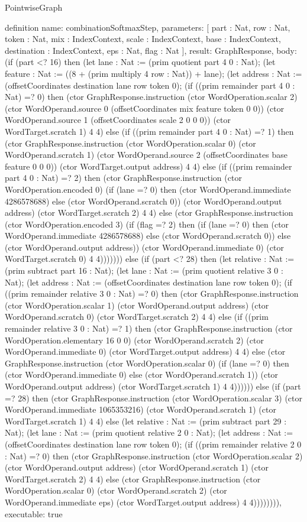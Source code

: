 \begin{lexlean}{PointwiseGraph}
\begin{semanticmodule}
definition{
  name: combinationSoftmaxStep,
  parameters: [
    part : Nat,
    row : Nat,
    token : Nat,
    mix : IndexContext,
    scale : IndexContext,
    base : IndexContext,
    destination : IndexContext,
    eps : Nat,
    flag : Nat
  ],
  result: GraphResponse,
  body: (if (part <? 16) then (let lane : Nat := (prim quotient part 4 0 : Nat); (let feature : Nat := ((8 + (prim multiply 4 row : Nat)) + lane); (let address : Nat := (offsetCoordinates destination lane row token 0); (if ((prim remainder part 4 0 : Nat) =? 0) then (ctor GraphResponse.instruction (ctor WordOperation.scalar 2) (ctor WordOperand.source 0 (offsetCoordinates mix feature token 0 0)) (ctor WordOperand.source 1 (offsetCoordinates scale 2 0 0 0)) (ctor WordTarget.scratch 1) 4 4) else (if ((prim remainder part 4 0 : Nat) =? 1) then (ctor GraphResponse.instruction (ctor WordOperation.scalar 0) (ctor WordOperand.scratch 1) (ctor WordOperand.source 2 (offsetCoordinates base feature 0 0 0)) (ctor WordTarget.output address) 4 4) else (if ((prim remainder part 4 0 : Nat) =? 2) then (ctor GraphResponse.instruction (ctor WordOperation.encoded 0) (if (lane =? 0) then (ctor WordOperand.immediate 4286578688) else (ctor WordOperand.scratch 0)) (ctor WordOperand.output address) (ctor WordTarget.scratch 2) 4 4) else (ctor GraphResponse.instruction (ctor WordOperation.encoded 3) (if (flag =? 2) then (if (lane =? 0) then (ctor WordOperand.immediate 4286578688) else (ctor WordOperand.scratch 0)) else (ctor WordOperand.output address)) (ctor WordOperand.immediate 0) (ctor WordTarget.scratch 0) 4 4))))))) else (if (part <? 28) then (let relative : Nat := (prim subtract part 16 : Nat); (let lane : Nat := (prim quotient relative 3 0 : Nat); (let address : Nat := (offsetCoordinates destination lane row token 0); (if ((prim remainder relative 3 0 : Nat) =? 0) then (ctor GraphResponse.instruction (ctor WordOperation.scalar 1) (ctor WordOperand.output address) (ctor WordOperand.scratch 0) (ctor WordTarget.scratch 2) 4 4) else (if ((prim remainder relative 3 0 : Nat) =? 1) then (ctor GraphResponse.instruction (ctor WordOperation.elementary 16 0 0) (ctor WordOperand.scratch 2) (ctor WordOperand.immediate 0) (ctor WordTarget.output address) 4 4) else (ctor GraphResponse.instruction (ctor WordOperation.scalar 0) (if (lane =? 0) then (ctor WordOperand.immediate 0) else (ctor WordOperand.scratch 1)) (ctor WordOperand.output address) (ctor WordTarget.scratch 1) 4 4)))))) else (if (part =? 28) then (ctor GraphResponse.instruction (ctor WordOperation.scalar 3) (ctor WordOperand.immediate 1065353216) (ctor WordOperand.scratch 1) (ctor WordTarget.scratch 1) 4 4) else (let relative : Nat := (prim subtract part 29 : Nat); (let lane : Nat := (prim quotient relative 2 0 : Nat); (let address : Nat := (offsetCoordinates destination lane row token 0); (if ((prim remainder relative 2 0 : Nat) =? 0) then (ctor GraphResponse.instruction (ctor WordOperation.scalar 2) (ctor WordOperand.output address) (ctor WordOperand.scratch 1) (ctor WordTarget.scratch 2) 4 4) else (ctor GraphResponse.instruction (ctor WordOperation.scalar 0) (ctor WordOperand.scratch 2) (ctor WordOperand.immediate eps) (ctor WordTarget.output address) 4 4)))))))),
  executable: true
}


\end{semanticmodule}
\end{lexlean}

